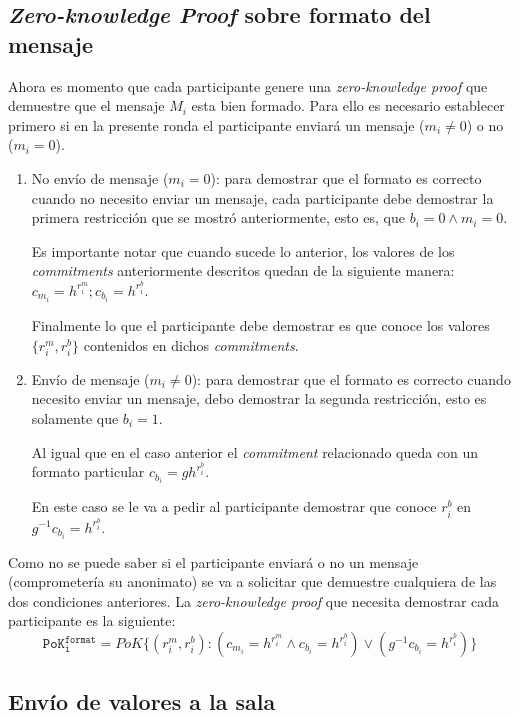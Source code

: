 \subsection{\emph{Zero-knowledge Proof} sobre formato del mensaje}

Ahora es momento que cada participante genere una \emph{zero-knowledge proof} que 
demuestre que el mensaje $M_i$ esta bien formado. Para ello es necesario establecer 
primero si en la presente ronda el participante enviará un mensaje ($m_i \neq 0$) o 
no ($m_i = 0$).

\begin{enumerate}
    \item No envío de mensaje ($m_i = 0$): para demostrar que el formato es correcto 
    cuando no necesito enviar un mensaje, cada participante debe demostrar la primera 
    restricción que se mostró anteriormente, esto es, que $b_i = 0 \land m_i = 0$.
    
    Es importante notar que cuando sucede lo anterior, los valores de los 
    \emph{commitments} anteriormente descritos quedan de la siguiente manera: 
    $c_{m_i} = h^{r_i^m}; c_{b_i} = h^{r_i^b}$.
    
    Finalmente lo que el participante debe demostrar es que conoce los valores 
    $\{r_i^m, r_i^b\}$ contenidos en dichos \emph{commitments}.
    \item Envío de mensaje ($m_i \neq 0$): para demostrar que el formato es 
    correcto cuando necesito enviar un mensaje, debo demostrar la segunda 
    restricción, esto es solamente que $b_i = 1$.
    
    Al igual que en el caso anterior el \emph{commitment} relacionado queda con 
    un formato particular $c_{b_i} = g h^{r_i^b}$.
    
    En este caso se le va a pedir al participante demostrar que conoce $r_i^b$ 
    en $g^{-1} c_{b_i} = h^{r_i^b}$.
\end{enumerate}

Como no se puede saber si el participante enviará o no un mensaje 
(comprometería su anonimato) se va a solicitar que demuestre cualquiera de las 
dos condiciones anteriores. La \emph{zero-knowledge proof} que necesita demostrar 
cada participante es la siguiente: 
$$\mathtt{PoK_i^{format}} = PoK\{(r_i^m, r_i^b) : (c_{m_i} = h^{r_i^m} \land c_{b_i} = h^{r_i^b}) \lor (g^{-1} c_{b_i} = h^{r_i^b})\}$$

\subsection{Envío de valores a la sala}

